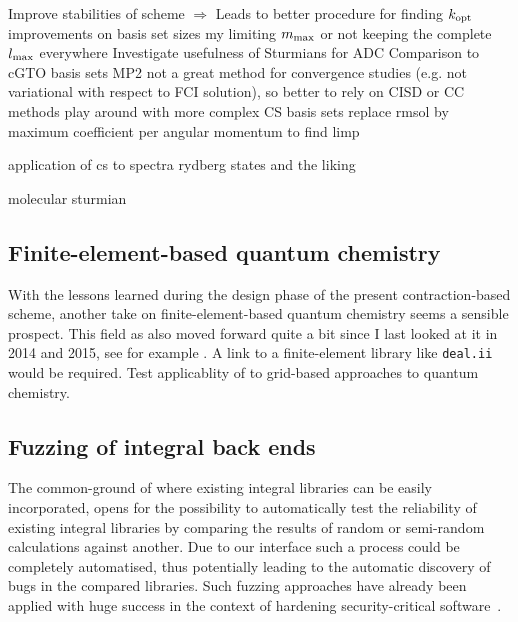 %
%
Improve stabilities of \SCF scheme $\Rightarrow$ Leads to better procedure for finding $k_\text{opt}$
%
improvements on basis set sizes my limiting $m_\text{max}$ or not keeping the complete $l_\text{max}$ everywhere
Investigate usefulness of Sturmians for ADC
Comparison to cGTO basis sets
MP2 not a great method for convergence studies (e.g. not variational with respect to FCI solution), so better to rely on CISD or CC methods
play around with more complex CS basis sets
replace rmsol by maximum coefficient per angular momentum to find limp




application of cs to spectra
rydberg states and the liking

molecular sturmian


\subsection{Finite-element-based quantum chemistry}
With the lessons learned during the design phase of the present
contraction-based \SCF scheme,
another take on finite-element-based quantum chemistry
seems a sensible prospect.
This field as also moved forward quite a bit since
I last looked at it in 2014 and 2015, see for example \cite{Davydov2015,Boffi2016}.
A link to a finite-element library like \texttt{deal.ii}~\cite{Arndt2017}
would be required.
Test applicablity of \molsturm to grid-based approaches to quantum chemistry.


\subsection{Fuzzing of integral back ends}
The common-ground \SCF of \molsturm where existing integral libraries
can be easily incorporated,
opens for the possibility to automatically test the reliability
of existing integral libraries by comparing the results of
random or semi-random \SCF calculations against another.
Due to our \python interface such a process could be completely automatised,
thus potentially leading to the automatic discovery of bugs in the compared libraries.
Such fuzzing approaches have already been applied with huge success
in the context of hardening security-critical software~\cite{Fuzzing}.
